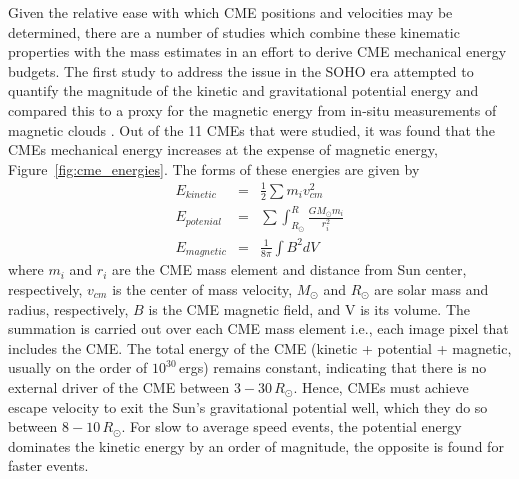 Given the relative ease with which CME positions and velocities may be determined, there are a number of studies which combine these kinematic properties with the mass estimates in an effort to derive CME mechanical energy budgets. The first study to address the issue in the SOHO era attempted to quantify the magnitude of the kinetic and gravitational potential energy and compared this to a proxy for the magnetic energy from in-situ measurements of magnetic clouds \citep{vou00}. Out of the 11 CMEs that were studied, it was found that the CMEs mechanical energy increases at the expense of magnetic energy, Figure~\ref{fig:cme_energies}. The forms of these energies are given by
\begin{eqnarray}
E_{kinetic} & = & \frac{1}{2}\sum m_i v_{cm}^2 \\
E_{potenial} & = & \sum \int_{R_{\odot}}^{R} \frac{GM_{\odot}m_i}{r^2_i}\\
E_{magnetic} & = & \frac{1}{8\pi}\int B^2 dV
\end{eqnarray}
where $m_i$ and $r_i$ are the CME mass element and distance from Sun center, respectively, $v_{cm}$ is the center of mass velocity, $M_{\odot}$ and $R_{\odot}$ are solar mass and radius, respectively, $B$ is the CME magnetic field, and V is its volume. The summation is carried out over each CME mass element i.e., each image pixel that includes the CME. The total energy of the CME (kinetic + potential + magnetic, usually on the order of $10^{30}$\,ergs) remains constant, indicating that there is no external driver of the CME between $3-30\,R_{\odot}$. Hence, CMEs must achieve escape velocity to exit the Sun's gravitational potential well, which they do so between $8-10\,R_{\odot}$. For slow to average speed events, the potential energy dominates the kinetic energy by an order of magnitude, the opposite is found for faster events. 

